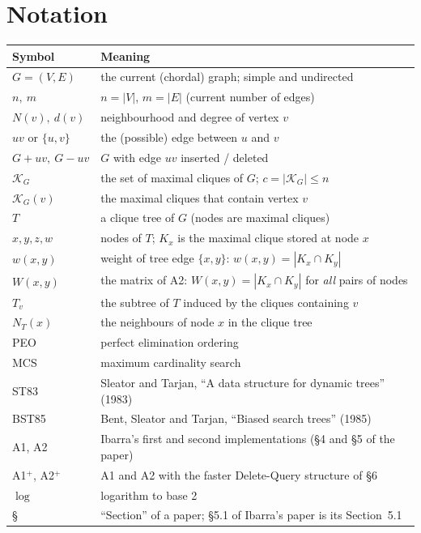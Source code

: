 \documentclass[11pt,a4paper,oneside]{report}
\theoremstyle{plain}
\theoremstyle{definition}
\theoremstyle{remark}
\newcommand{\KG}{\mathcal{K}_G}
\begin{document}
\clearpage
\section*{Notation}
\begin{longtable}{@{}p{}p{}@{}}
\toprule
\textbf{Symbol} & \textbf{Meaning}\\
\midrule
\endhead
\(G=(V,E)\) & the current (chordal) graph; simple and undirected\\
\(n,\ m\) & \(n=|V|\), \(m=|E|\) (current number of edges)\\
\(N(v),\ d(v)\) & neighbourhood and degree of vertex \(v\)\\
\(uv\) or \(\{u,v\}\) & the (possible) edge between \(u\) and \(v\)\\
\(G+uv,\ G-uv\) & \(G\) with edge \(uv\) inserted / deleted\\
\(\KG\) & the set of maximal cliques of \(G\); \(c=|\KG|\le n\)\\
\(\KG(v)\) & the maximal cliques that contain vertex \(v\)\\
\(T\) & a clique tree of \(G\) (nodes are maximal cliques)\\
\(x,y,z,w\) & nodes of \(T\); \(K_x\) is the maximal clique stored at node \(x\)\\
\(w(x,y)\) & weight of tree edge \(\{x,y\}\): \(w(x,y)=|K_x\cap K_y|\)\\
\(W(x,y)\) & the matrix of A2: \(W(x,y)=|K_x\cap K_y|\) for \emph{all} pairs of nodes\\
\(T_v\) & the subtree of \(T\) induced by the cliques containing \(v\)\\
\(N_T(x)\) & the neighbours of node \(x\) in the clique tree\\
PEO & perfect elimination ordering\\
MCS & maximum cardinality search\\
ST83 & Sleator and Tarjan, ``A data structure for dynamic trees'' (1983)\\
BST85 & Bent, Sleator and Tarjan, ``Biased search trees'' (1985)\\
A1, A2 & Ibarra's first and second implementations (\S4 and \S5 of the paper)\\
A1\(^+\), A2\(^+\) & A1 and A2 with the faster Delete-Query structure of \S6\\
\(\log\) & logarithm to base 2\\
\S & ``Section'' of a paper; \S5.1 of Ibarra's paper is its Section~5.1\\
\bottomrule
\end{longtable}
\end{document}
